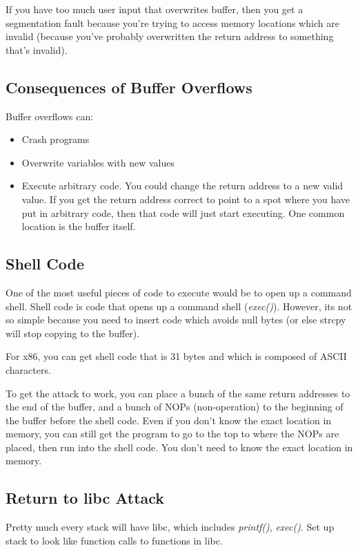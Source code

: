 \documentclass[psamsfonts]{amsart}
\begin{document}
If you have too much user input that overwrites buffer, then you get a segmentation fault because you're trying to access memory locations which are invalid (because you've probably overwritten the return address to something that's invalid).

\subsection{Consequences of Buffer Overflows}

Buffer overflows can:
\begin{itemize}
  \item Crash programs
  \item Overwrite variables with new values
  \item Execute arbitrary code. You could change the return address to a new valid value. If you get the return address correct to point to a spot where you have put in arbitrary code, then that code will just start executing. One common location is the buffer itself.
\end{itemize}

\subsection{Shell Code}

One of the most useful pieces of code to execute would be to open up a command shell. Shell code is code that opens up a command shell (\emph{exec()}). However, its not so simple because you need to insert code which avoids null bytes (or else strcpy will stop copying to the buffer).

For x86, you can get shell code that is 31 bytes and which is composed of ASCII characters.

To get the attack to work, you can place a bunch of the same return addresses to the end of the buffer, and a bunch of NOPs (non-operation) to the beginning of the buffer before the shell code. Even if you don't know the exact location in memory, you can still get the program to go to the top to where the NOPs are placed, then run into the shell code. You don't need to know the exact location in memory.

\subsection{Return to libc Attack}

Pretty much every stack will have libc, which includes \emph{printf()}, \emph{exec()}. Set up stack to look like function calls to functions in libc.
\end{document}
